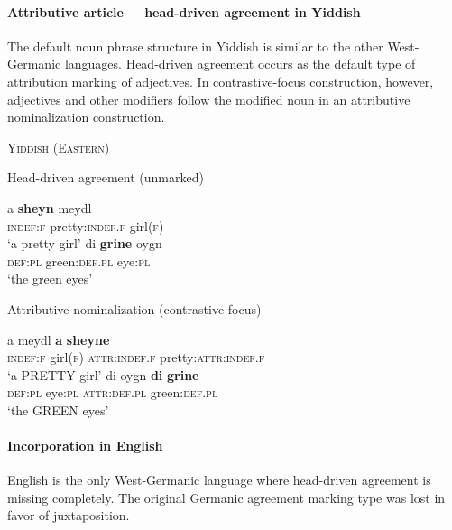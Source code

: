 \paragraph{Attributive article + head-driven agreement in Yiddish} \label{yiddish synchr}
The default noun phrase structure in Yiddish is similar to the other West-Germanic languages. Head-driven agreement occurs as the default type of attribution marking of adjectives. In contrastive-focus construction, however, adjectives and other modifiers follow the modified noun in an attributive nominalization construction.
\begin{exe}
\ex \textsc{Yiddish (Eastern)} \cite[96]{jacobs-etal1994}
\begin{xlist}
\ex Head-driven agreement (unmarked)
\begin{xlist}
\ex 
\gll	a \textbf{sheyn} meydl\\
	\textsc{indef:f} pretty:\textsc{indef.f} girl\textsc{(f)}\\
\glt	‘a pretty girl’
\ex
\gll	di \textbf{grine} oygn\\
	\textsc{def:pl} green:\textsc{def.pl} eye:\textsc{pl}\\
\glt	‘the green eyes’
\end{xlist}
\ex Attributive nominalization (contrastive focus)
\begin{xlist}
\ex
\gll	a meydl \textbf{a} \textbf{sheyne}\\
	\textsc{indef:f} girl\textsc{(f)} \textsc{attr:indef.f} pretty:\textsc{attr:indef.f}\\
\glt	‘a PRETTY girl’
\ex
\gll	di oygn \textbf{di} \textbf{grine}\\
	\textsc{def:pl} eye:\textsc{pl} \textsc{attr:def.pl} green:\textsc{def.pl} \\
\glt	‘the GREEN eyes’
\end{xlist}
\end{xlist}
\end{exe}

\paragraph{Incorporation in English}
English is the only West-Germanic language where head-driven agreement is missing completely. The original Germanic agreement marking type was lost in favor of juxtaposition. 

